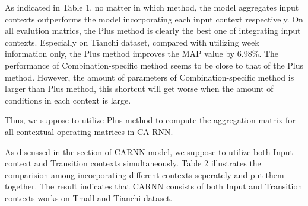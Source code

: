 \documentclass[conference]{IEEEtran}
\begin{document}
As indicated in Table 1, no matter in which method, the model aggregates input contexts outperforms the model incorporating each input context respectively. On all evalution matrics, the Plus method is clearly the best one of integrating input contexts. Especially on Tianchi dataset, compared with utilizing week information only, the Plus method improves the MAP value by 6.98\%. The performance of Combination-specific method seems to be close to that of the Plus method. However, the amount of parameters of Combination-specific method is larger than Plus method, this shortcut will get worse when the amount of conditions in each context is large. 

Thus, we suppose to utilize Plus method to compute the aggregation matrix for all contextual operating matrices in CA-RNN.

As discussed in the section of CARNN model, we suppose to utilize both Input context and Transition contexts simultaneously. Table 2  illustrates the comparision among incorporating different contexts seperately and put them together. The result indicates that CARNN consists of both Input and Transition contexts works on Tmall and Tianchi dataset. 
\end{document}
